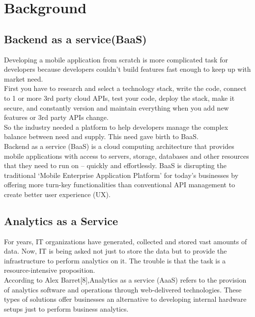 \documentclass[a4paper,12pt]{report}
\begin{document}
    
    
    \chapter {Background}            
    \section{Backend as a service(BaaS)}    
    Developing a mobile application from scratch is more complicated task for developers because developers couldn’t build features fast enough to keep up with market need. \\
    First you have to research and select a technology stack, write the code, connect to 1 or more 3rd party cloud APIs, test your code, deploy the stack, make it secure, and constantly version and maintain everything when you add new features or 3rd party APIs change. \\
    So the industry needed a platform to help developers manage the complex balance between need and supply. This need gave birth to BaaS. \\    
    Backend as a service (BaaS) is a cloud computing architecture that provides mobile applications with access to servers, storage, databases and other resources that they need to run on – quickly and effortlessly. BaaS is disrupting the traditional ‘Mobile Enterprise Application Platform’ for today’s businesses by offering more turn-key functionalities than conventional API management to create better user experience (UX). \\
    
    \section{Analytics as a Service}    
    For years, IT organizations have generated, collected and stored vast amounts of data. Now, IT is being asked not just to store the data but to provide the infrastructure to perform analytics on it. The trouble is that the task is a resource-intensive proposition. \\    
    According to Alex Barret[8],Analytics as a service (AaaS) refers to the provision of analytics software and operations through web-delivered technologies. These types of solutions offer businesses an alternative to developing internal hardware setups just to perform business analytics. \\
\end{document}
